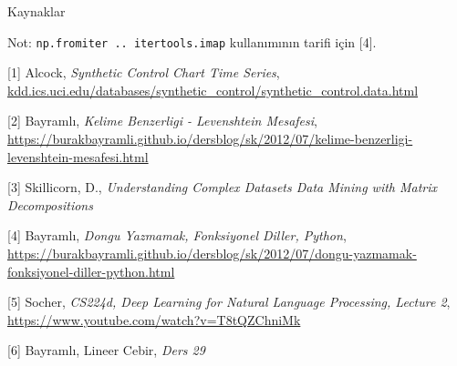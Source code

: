 \documentclass[12pt,fleqn]{article}\usepackage{../../common}
\begin{document}
Kaynaklar

Not: \verb!np.fromiter .. itertools.imap! kullanımının tarifi için [4].

[1] Alcock, {\em Synthetic Control Chart Time Series}, \url{kdd.ics.uci.edu/databases/synthetic_control/synthetic_control.data.html}

[2] Bayramlı, 
    {\em Kelime Benzerligi - Levenshtein Mesafesi}, 
    \url{https://burakbayramli.github.io/dersblog/sk/2012/07/kelime-benzerligi-levenshtein-mesafesi.html}

[3] Skillicorn, D., {\em Understanding Complex Datasets Data Mining with Matrix Decompositions}

[4] Bayramlı, 
    {\em Dongu Yazmamak, Fonksiyonel Diller, Python}, 
    \url{https://burakbayramli.github.io/dersblog/sk/2012/07/dongu-yazmamak-fonksiyonel-diller-python.html}

[5] Socher, {\em CS224d, Deep Learning for Natural Language Processing,
  Lecture 2}, \url{https://www.youtube.com/watch?v=T8tQZChniMk}

[6] Bayramlı, Lineer Cebir, {\em Ders 29}
\end{document}
